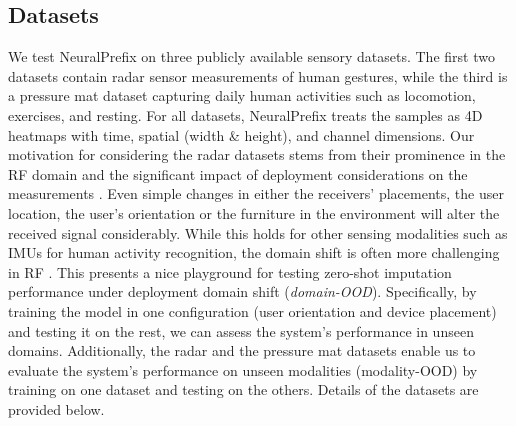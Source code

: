 \documentclass[10pt, conference, compsocconf]{IEEEtran}
\def\AK#1{{\bf [Abdo:} {\it\color{teal} {#1}}{\bf ]}}
\def\update#1{#1}
\begin{document}

\subsection{Datasets}
\label{sec:eval_dataset}


We test NeuralPrefix on three publicly available sensory datasets. The first two datasets contain radar sensor measurements of human gestures, while the third is a pressure mat dataset capturing daily human activities such as locomotion, exercises, and resting. For all datasets, NeuralPrefix treats the samples as 4D heatmaps with time, spatial (width \& height), and channel dimensions. Our motivation for considering the radar datasets stems from their prominence in the RF domain \cite {wang2022placement} and the significant impact of deployment considerations on the measurements \cite{wang2022placement}. Even simple changes in either the \update{receivers'} placements, the user location, the user's orientation or the furniture in the environment will alter the received signal considerably. While this \update{holds} for other sensing modalities such as IMUs for human activity recognition, the domain shift is often more challenging in RF \cite{nirmal2021deep}. This presents a nice playground for testing zero-shot imputation performance under deployment domain shift (\textit{domain-OOD}).  Specifically, by training the model in one configuration (user orientation and device placement) and testing it on the rest, we can assess the system's performance in unseen domains. Additionally, the radar and the pressure mat datasets enable us to evaluate the system's performance on unseen modalities (modality-OOD) by training on one dataset and testing on the others. Details of the datasets are provided below.
\end{document}
